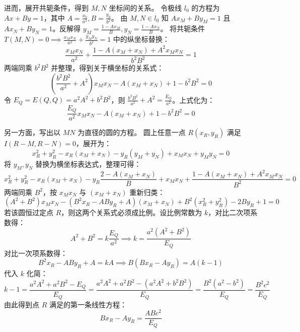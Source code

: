 \begin{solution}
进而，展开共轭条件，得到 $M,N$ 坐标间的关系。
令极线 $l_0$ 的方程为 $A x + B y = 1$，其中 $A = \frac{x_0}{a^2}, B = \frac{y_0}{b^2}$。
由 $M, N \in l_0$ 知 $A x_M + B y_M = 1$ 且 $A x_N + B y_N = 1$。反解得 $y_M = \frac{1 - A x_M}{B}, y_N = \frac{1 - A x_N}{B}$。
将共轭条件 $T(M,N) = 0 \implies \frac{x_M x_N}{a^2} + \frac{y_M y_N}{b^2} = 1$ 中的纵坐标替换：
$$ \frac{x_M x_N}{a^2} + \frac{1 - A(x_M+x_N) + A^2 x_M x_N}{b^2 B^2} = 1 $$
两端同乘 $b^2 B^2$ 并整理，得到关于横坐标的关系式：
$$ \left( \frac{b^2 B^2}{a^2} + A^2 \right) x_M x_N - A(x_M + x_N) + 1 - b^2 B^2 = 0 $$
令 $E_Q = E(Q,Q) = a^2 A^2 + b^2 B^2$，则 $\frac{b^2 B^2}{a^2} + A^2 = \frac{E_Q}{a^2}$。上式化为：
$$ \frac{E_Q}{a^2} x_M x_N - A(x_M + x_N) + 1 - b^2 B^2 = 0 $$

另一方面，写出以 $MN$ 为直径的圆的方程。
圆上任意一点 $R(x_R, y_R)$ 满足 $I(R-M, R-N) = 0$，展开为：
$$ x_R^2 + y_R^2 - x_R(x_M+x_N) - y_R(y_M+y_N) + x_M x_N + y_M y_N = 0 $$
将 $y_M, y_N$ 替换为横坐标表达式，整理可得：
$$ x_R^2 + y_R^2 - x_R(x_M+x_N) - y_R \frac{2 - A(x_M+x_N)}{B} + x_M x_N + \frac{1 - A(x_M+x_N) + A^2 x_M x_N}{B^2} = 0 $$
两端同乘 $B^2$，按 $x_M x_N$ 与 $(x_M+x_N)$ 重新归类：
$$ (A^2 + B^2)x_M x_N - (B^2 x_R - A B y_R + A)(x_M+x_N) + B^2(x_R^2 + y_R^2) - 2B y_R + 1 = 0 $$
若该圆恒过定点 $R$，则这两个关系式必须成比例。设比例常数为 $k$，对比二次项系数得：
$$ A^2 + B^2 = k \frac{E_Q}{a^2} \implies k = \frac{a^2(A^2 + B^2)}{E_Q} $$
对比一次项系数得：
$$ B^2 x_R - A B y_R + A = k A \implies B(B x_R - A y_R) = A(k - 1) $$
代入 $k$ 化简：
$$ k - 1 = \frac{a^2 A^2 + a^2 B^2 - E_Q}{E_Q} = \frac{a^2 A^2 + a^2 B^2 - (a^2 A^2 + b^2 B^2)}{E_Q} = \frac{B^2(a^2 - b^2)}{E_Q} = \frac{B^2 c^2}{E_Q} $$
由此得到点 $R$ 满足的第一条线性方程：
$$ B x_R - A y_R = \frac{A B c^2}{E_Q} $$


\end{solution}
